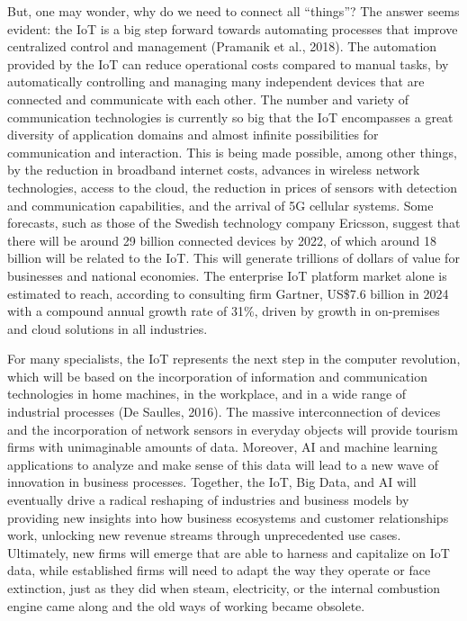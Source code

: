 \documentclass[
  letterpaper,
  DIV=11,
  numbers=noendperiod]{scrreprt}
\begin{document}
But, one may wonder, why do we need to connect all ``things''? The
answer seems evident: the IoT is a big step forward towards automating
processes that improve centralized control and management (Pramanik et
al., 2018). The automation provided by the IoT can reduce operational
costs compared to manual tasks, by automatically controlling and
managing many independent devices that are connected and communicate
with each other. The number and variety of communication technologies is
currently so big that the IoT encompasses a great diversity of
application domains and almost infinite possibilities for communication
and interaction. This is being made possible, among other things, by the
reduction in broadband internet costs, advances in wireless network
technologies, access to the cloud, the reduction in prices of sensors
with detection and communication capabilities, and the arrival of 5G
cellular systems. Some forecasts, such as those of the Swedish
technology company Ericsson, suggest that there will be around 29
billion connected devices by 2022, of which around 18 billion will be
related to the IoT. This will generate trillions of dollars of value for
businesses and national economies. The enterprise IoT platform market
alone is estimated to reach, according to consulting firm Gartner,
US\$7.6 billion in 2024 with a compound annual growth rate of 31\%,
driven by growth in on-premises and cloud solutions in all industries.

For many specialists, the IoT represents the next step in the computer
revolution, which will be based on the incorporation of information and
communication technologies in home machines, in the workplace, and in a
wide range of industrial processes (De Saulles, 2016). The massive
interconnection of devices and the incorporation of network sensors in
everyday objects will provide tourism firms with unimaginable amounts of
data. Moreover, AI and machine learning applications to analyze and make
sense of this data will lead to a new wave of innovation in business
processes. Together, the IoT, Big Data, and AI will eventually drive a
radical reshaping of industries and business models by providing new
insights into how business ecosystems and customer relationships work,
unlocking new revenue streams through unprecedented use cases.
Ultimately, new firms will emerge that are able to harness and
capitalize on IoT data, while established firms will need to adapt the
way they operate or face extinction, just as they did when steam,
electricity, or the internal combustion engine came along and the old
ways of working became obsolete.
\end{document}
